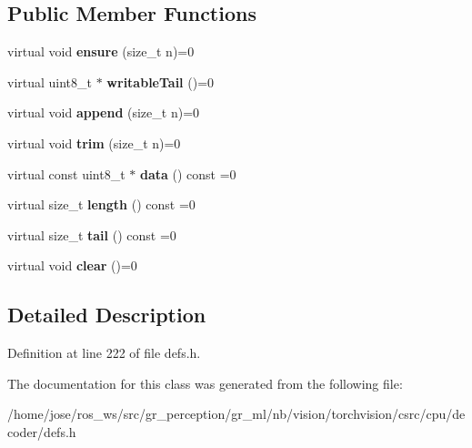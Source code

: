\subsection*{Public Member Functions}
\begin{DoxyCompactItemize}
\item 
\mbox{\label{classffmpeg_1_1ByteStorage_a356584420471304796cb35d335a43ee0}} 
virtual void {\bfseries ensure} (size\+\_\+t n)=0
\item 
\mbox{\label{classffmpeg_1_1ByteStorage_a3b3cf1bb8db2b497156b1fe3f51a1455}} 
virtual uint8\+\_\+t $\ast$ {\bfseries writable\+Tail} ()=0
\item 
\mbox{\label{classffmpeg_1_1ByteStorage_aba704f4a84580b56bd41004f0d15dc4e}} 
virtual void {\bfseries append} (size\+\_\+t n)=0
\item 
\mbox{\label{classffmpeg_1_1ByteStorage_a045a385972b687610e0d4e95b31e3345}} 
virtual void {\bfseries trim} (size\+\_\+t n)=0
\item 
\mbox{\label{classffmpeg_1_1ByteStorage_a2ab12348785684d4c238430fbc0b792c}} 
virtual const uint8\+\_\+t $\ast$ {\bfseries data} () const =0
\item 
\mbox{\label{classffmpeg_1_1ByteStorage_a06334e007a47d719712f92a67155b659}} 
virtual size\+\_\+t {\bfseries length} () const =0
\item 
\mbox{\label{classffmpeg_1_1ByteStorage_ae5c4f09f3852146b6a23c5557017cc3c}} 
virtual size\+\_\+t {\bfseries tail} () const =0
\item 
\mbox{\label{classffmpeg_1_1ByteStorage_aa566d6041cb2912152b123c3691d2816}} 
virtual void {\bfseries clear} ()=0
\end{DoxyCompactItemize}


\subsection{Detailed Description}


Definition at line 222 of file defs.\+h.



The documentation for this class was generated from the following file\+:\begin{DoxyCompactItemize}
\item 
/home/jose/ros\+\_\+ws/src/gr\+\_\+perception/gr\+\_\+ml/nb/vision/torchvision/csrc/cpu/decoder/defs.\+h\end{DoxyCompactItemize}
